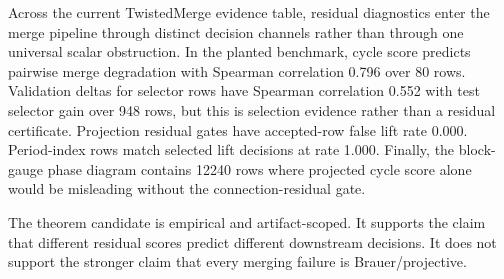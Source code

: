 \begin{theorem}
Across the current TwistedMerge evidence table, residual diagnostics enter the
merge pipeline through distinct decision channels rather than through one
universal scalar obstruction.  In the planted benchmark, cycle score predicts
pairwise merge degradation with Spearman correlation 0.796
over 80 rows.  Validation deltas for selector rows have
Spearman correlation 0.552 with test selector gain over
948 rows, but this is selection evidence rather than a residual
certificate.  Projection residual gates have accepted-row false lift rate
0.000.  Period-index rows match selected
lift decisions at rate 1.000.  Finally, the block-gauge
phase diagram contains 12240 rows where projected cycle score
alone would be misleading without the connection-residual gate.
\end{theorem}

\begin{remark}
The theorem candidate is empirical and artifact-scoped.  It supports the claim
that different residual scores predict different downstream decisions.  It does
not support the stronger claim that every merging failure is Brauer/projective.
\end{remark}
